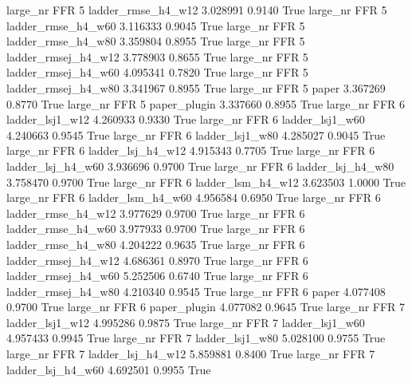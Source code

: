   large_nr      FFR                 5  ladder_rmse_h4_w12    3.028991      0.9140    True
  large_nr      FFR                 5  ladder_rmse_h4_w60    3.116333      0.9045    True
  large_nr      FFR                 5  ladder_rmse_h4_w80    3.359804      0.8955    True
  large_nr      FFR                 5 ladder_rmsej_h4_w12    3.778903      0.8655    True
  large_nr      FFR                 5 ladder_rmsej_h4_w60    4.095341      0.7820    True
  large_nr      FFR                 5 ladder_rmsej_h4_w80    3.341967      0.8955    True
  large_nr      FFR                 5               paper    3.367269      0.8770    True
  large_nr      FFR                 5        paper_plugin    3.337660      0.8955    True
  large_nr      FFR                 6     ladder_lsj1_w12    4.260933      0.9330    True
  large_nr      FFR                 6     ladder_lsj1_w60    4.240663      0.9545    True
  large_nr      FFR                 6     ladder_lsj1_w80    4.285027      0.9045    True
  large_nr      FFR                 6   ladder_lsj_h4_w12    4.915343      0.7705    True
  large_nr      FFR                 6   ladder_lsj_h4_w60    3.936696      0.9700    True
  large_nr      FFR                 6   ladder_lsj_h4_w80    3.758470      0.9700    True
  large_nr      FFR                 6   ladder_lsm_h4_w12    3.623503      1.0000    True
  large_nr      FFR                 6   ladder_lsm_h4_w60    4.956584      0.6950    True
  large_nr      FFR                 6  ladder_rmse_h4_w12    3.977629      0.9700    True
  large_nr      FFR                 6  ladder_rmse_h4_w60    3.977933      0.9700    True
  large_nr      FFR                 6  ladder_rmse_h4_w80    4.204222      0.9635    True
  large_nr      FFR                 6 ladder_rmsej_h4_w12    4.686361      0.8970    True
  large_nr      FFR                 6 ladder_rmsej_h4_w60    5.252506      0.6740    True
  large_nr      FFR                 6 ladder_rmsej_h4_w80    4.210340      0.9545    True
  large_nr      FFR                 6               paper    4.077408      0.9700    True
  large_nr      FFR                 6        paper_plugin    4.077082      0.9645    True
  large_nr      FFR                 7     ladder_lsj1_w12    4.995286      0.9875    True
  large_nr      FFR                 7     ladder_lsj1_w60    4.957433      0.9945    True
  large_nr      FFR                 7     ladder_lsj1_w80    5.028100      0.9755    True
  large_nr      FFR                 7   ladder_lsj_h4_w12    5.859881      0.8400    True
  large_nr      FFR                 7   ladder_lsj_h4_w60    4.692501      0.9955    True
